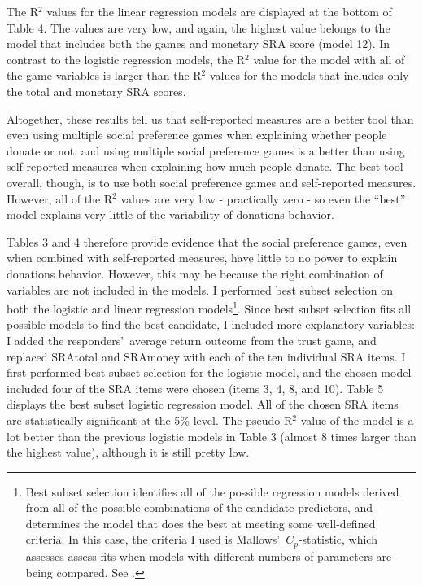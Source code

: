 \documentclass[12pt]{article}
\begin{document}
The R$^{2}$ values for the linear regression models are displayed at the bottom of Table 4. The values are very low, and again, the highest value belongs to the model that includes both the games and monetary SRA score (model 12). In contrast to the logistic regression models, the R$^{2}$ value for the model with all of the game variables is larger than the R$^{2}$ values for the models that includes only the total and monetary SRA scores. 

Altogether, these results tell us that self-reported measures are a better tool than even using multiple social preference games when explaining whether people donate or not, and using multiple social preference games is a better than using self-reported measures when explaining how much people donate. The best tool overall, though, is to use both social preference games and self-reported measures. However, all of the R$^{2}$ values are very low - practically zero - so even the ``best'' model explains very little of the variability of donations behavior.

Tables 3 and 4 therefore provide evidence that the social preference games, even when combined with self-reported measures, have little to no power to explain donations behavior. However, this may be because the right combination of variables are not included in the models. I performed best subset selection on both the logistic and linear regression models\footnote{Best subset selection identifies all of the possible regression models derived from all of the possible combinations of the candidate predictors, and determines the model that does the best at meeting some well-defined criteria. In this case, the criteria I used is Mallows\rq \ \(C_{p}\)-statistic, which assesses assess fits when models with different numbers of parameters are being compared.  See \cite{mallows_1973}.}. Since best subset selection fits all possible models to find the best candidate, I included more explanatory variables: I added the responders\rq \ average return outcome from the trust game, and replaced SRAtotal and SRAmoney with each of the ten individual SRA items. I first performed best subset selection for the logistic model, and the chosen model included four of the SRA items were chosen (items 3, 4, 8, and 10). Table 5 displays the best subset logistic regression model. All of the chosen SRA items are statistically significant at the 5\% level. The pseudo-R$^{2}$ value of the model is a lot better than the previous logistic models in Table 3 (almost 8 times larger than the highest value), although it is still pretty low. 
\end{document}
